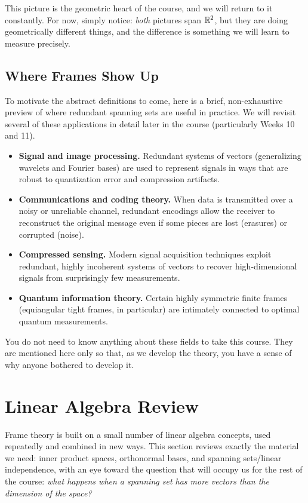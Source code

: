This picture is the geometric heart of the course, and we will return to it constantly. For now, simply notice: \emph{both} pictures span $\mathbb{R}^2$, but they are doing geometrically different things, and the difference is something we will learn to measure precisely.

\subsection{Where Frames Show Up}
\label{subsec:applications-preview}

To motivate the abstract definitions to come, here is a brief, non-exhaustive preview of where redundant spanning sets are useful in practice. We will revisit several of these applications in detail later in the course (particularly Weeks 10 and 11).

\begin{itemize}
  \item \textbf{Signal and image processing.} Redundant systems of vectors (generalizing wavelets and Fourier bases) are used to represent signals in ways that are robust to quantization error and compression artifacts.
  \item \textbf{Communications and coding theory.} When data is transmitted over a noisy or unreliable channel, redundant encodings allow the receiver to reconstruct the original message even if some pieces are lost (erasures) or corrupted (noise).
  \item \textbf{Compressed sensing.} Modern signal acquisition techniques exploit redundant, highly incoherent systems of vectors to recover high-dimensional signals from surprisingly few measurements.
  \item \textbf{Quantum information theory.} Certain highly symmetric finite frames (equiangular tight frames, in particular) are intimately connected to optimal quantum measurements.
\end{itemize}

You do not need to know anything about these fields to take this course. They are mentioned here only so that, as we develop the theory, you have a sense of why anyone bothered to develop it.

\section{Linear Algebra Review}
\label{sec:linalg-review}

Frame theory is built on a small number of linear algebra concepts, used repeatedly and combined in new ways. This section reviews exactly the material we need: inner product spaces, orthonormal bases, and spanning sets/linear independence, with an eye toward the question that will occupy us for the rest of the course: \emph{what happens when a spanning set has more vectors than the dimension of the space?}

